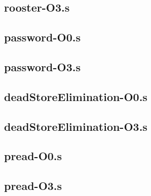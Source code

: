 \begin{appendices}
\subsection{rooster-O3.s}


\subsection{password-O0.s}

\subsection{password-O3.s}


\subsection{deadStoreElimination-O0.s}

\subsection{deadStoreElimination-O3.s}


\subsection{pread-O0.s}

\subsection{pread-O3.s}


\end{appendices}